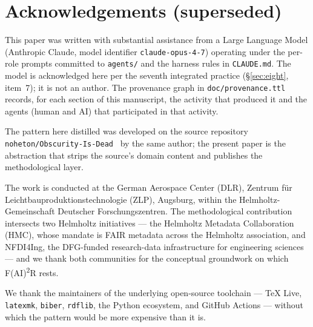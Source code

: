 \section*{Acknowledgements (superseded)}
\label{sec:acks}

This paper was written with substantial assistance from a Large
Language Model (Anthropic Claude, model identifier
\texttt{claude-opus-4-7}) operating under the per-role prompts
committed to \texttt{agents/} and the harness rules in
\texttt{CLAUDE.md}. The model is acknowledged here per the seventh
integrated practice (\S\ref{sec:eight}, item~7); it is not an
author. The provenance graph in \texttt{doc/provenance.ttl} records,
for each section of this manuscript, the activity that produced it
and the agents (human and AI) that participated in that activity.

The pattern here distilled was developed on the source repository
\texttt{noheton/Obscurity-Is-Dead}~\cite{krebs2026obscurity} by the
same author; the present paper is the abstraction that strips the
source's domain content and publishes the methodological layer.

The work is conducted at the German Aerospace Center (DLR), Zentrum
für Leichtbauproduktionstechnologie (ZLP), Augsburg, within the
Helmholtz-Gemeinschaft Deutscher Forschungszentren. The
methodological contribution intersects two Helmholtz initiatives ---
the Helmholtz Metadata Collaboration (HMC), whose mandate is FAIR
metadata across the Helmholtz association, and NFDI4Ing, the
DFG-funded research-data infrastructure for engineering sciences ---
and we thank both communities for the conceptual groundwork on which
F(AI)\textsuperscript{2}R rests.

We thank the maintainers of the underlying open-source toolchain ---
TeX Live, \texttt{latexmk}, \texttt{biber}, \texttt{rdflib}, the
Python ecosystem, and GitHub Actions --- without which the pattern
would be more expensive than it is.
